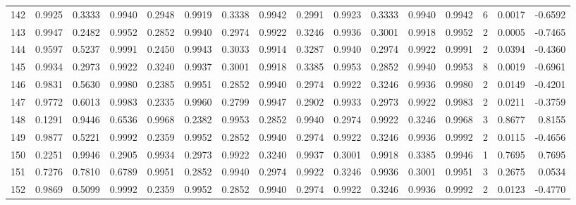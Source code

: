\begin{tabular}{lrrrrrrrrrrrrrrr}
142 &      0.9925 &  0.3333 &  0.9940 &  0.2948 &  0.9919 &  0.3338 &  0.9942 &  0.2991 &  0.9923 &  0.3333 &   0.9940 &     0.9942 &      6 &                    0.0017 &                    -0.6592 \\
143 &      0.9947 &  0.2482 &  0.9952 &  0.2852 &  0.9940 &  0.2974 &  0.9922 &  0.3246 &  0.9936 &  0.3001 &   0.9918 &     0.9952 &      2 &                    0.0005 &                    -0.7465 \\
144 &      0.9597 &  0.5237 &  0.9991 &  0.2450 &  0.9943 &  0.3033 &  0.9914 &  0.3287 &  0.9940 &  0.2974 &   0.9922 &     0.9991 &      2 &                    0.0394 &                    -0.4360 \\
145 &      0.9934 &  0.2973 &  0.9922 &  0.3240 &  0.9937 &  0.3001 &  0.9918 &  0.3385 &  0.9953 &  0.2852 &   0.9940 &     0.9953 &      8 &                    0.0019 &                    -0.6961 \\
146 &      0.9831 &  0.5630 &  0.9980 &  0.2385 &  0.9951 &  0.2852 &  0.9940 &  0.2974 &  0.9922 &  0.3246 &   0.9936 &     0.9980 &      2 &                    0.0149 &                    -0.4201 \\
147 &      0.9772 &  0.6013 &  0.9983 &  0.2335 &  0.9960 &  0.2799 &  0.9947 &  0.2902 &  0.9933 &  0.2973 &   0.9922 &     0.9983 &      2 &                    0.0211 &                    -0.3759 \\
148 &      0.1291 &  0.9446 &  0.6536 &  0.9968 &  0.2382 &  0.9953 &  0.2852 &  0.9940 &  0.2974 &  0.9922 &   0.3246 &     0.9968 &      3 &                    0.8677 &                     0.8155 \\
149 &      0.9877 &  0.5221 &  0.9992 &  0.2359 &  0.9952 &  0.2852 &  0.9940 &  0.2974 &  0.9922 &  0.3246 &   0.9936 &     0.9992 &      2 &                    0.0115 &                    -0.4656 \\
150 &      0.2251 &  0.9946 &  0.2905 &  0.9934 &  0.2973 &  0.9922 &  0.3240 &  0.9937 &  0.3001 &  0.9918 &   0.3385 &     0.9946 &      1 &                    0.7695 &                     0.7695 \\
151 &      0.7276 &  0.7810 &  0.6789 &  0.9951 &  0.2852 &  0.9940 &  0.2974 &  0.9922 &  0.3246 &  0.9936 &   0.3001 &     0.9951 &      3 &                    0.2675 &                     0.0534 \\
152 &      0.9869 &  0.5099 &  0.9992 &  0.2359 &  0.9952 &  0.2852 &  0.9940 &  0.2974 &  0.9922 &  0.3246 &   0.9936 &     0.9992 &      2 &                    0.0123 &                    -0.4770 \\

\end{tabular}
